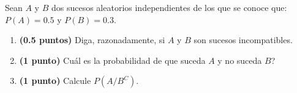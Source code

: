 
Sean $A$ y $B$ dos sucesos aleatorios independientes de los que se conoce que: $P(A)=0.5$ y $P(B)=0.3$.
\begin{enumerate}[label=\alph*)]
\item \textbf{(0.5 puntos)} Diga, razonadamente, si $A$ y $B$ son sucesos incompatibles.
\item \textbf{(1 punto)} \textquestiondown{}Cuál es la probabilidad de que suceda $A$ y no suceda $B$?
\item \textbf{(1 punto)} Calcule $P(A/B^C)$.
\end{enumerate}
